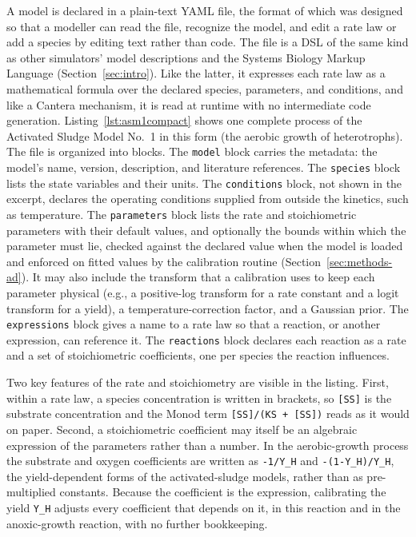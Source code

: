 \documentclass{article}
\begin{document}
A model is declared in a plain-text YAML file, the format of which was designed so that a modeller can read the file, recognize the model, and edit a rate law or add a species by editing text rather than code. The file is a DSL of the same kind as other simulators' model descriptions and the Systems Biology Markup Language (Section~\ref{sec:intro}). Like the latter, it expresses each rate law as a mathematical formula over the declared species, parameters, and conditions, and like a Cantera mechanism, it is read at runtime with no intermediate code generation. Listing~\ref{lst:asm1compact} shows one complete process of the Activated Sludge Model No.~1 in this form (the aerobic growth of heterotrophs). The file is organized into blocks. The \texttt{model} block carries the metadata: the model's name, version, description, and literature references. The \texttt{species} block lists the state variables and their units. The \texttt{conditions} block, not shown in the excerpt, declares the operating conditions supplied from outside the kinetics, such as temperature. The \texttt{parameters} block lists the rate and stoichiometric parameters with their default values, and optionally the bounds within which the parameter must lie, checked against the declared value when the model is loaded and enforced on fitted values by the calibration routine (Section~\ref{sec:methods-ad}). It may also include the transform that a calibration uses to keep each parameter physical (e.g., a positive-log transform for a rate constant and a logit transform for a yield), a temperature-correction factor, and a Gaussian prior. The \texttt{expressions} block gives a name to a rate law so that a reaction, or another expression, can reference it. The \texttt{reactions} block declares each reaction as a rate and a set of stoichiometric coefficients, one per species the reaction influences.



Two key features of the rate and stoichiometry are visible in the listing. First, within a rate law, a species concentration is written in brackets, so \texttt{[SS]} is the substrate concentration and the Monod term \texttt{[SS]/(KS~+~[SS])} reads as it would on paper. Second, a stoichiometric coefficient may itself be an algebraic expression of the parameters rather than a number. In the aerobic-growth process the substrate and oxygen coefficients are written as \texttt{-1/Y\_H} and \texttt{-(1-Y\_H)/Y\_H}, the yield-dependent forms of the activated-sludge models, rather than as pre-multiplied constants. Because the coefficient is the expression, calibrating the yield \texttt{Y\_H} adjusts every coefficient that depends on it, in this reaction and in the anoxic-growth reaction, with no further bookkeeping.
\end{document}
